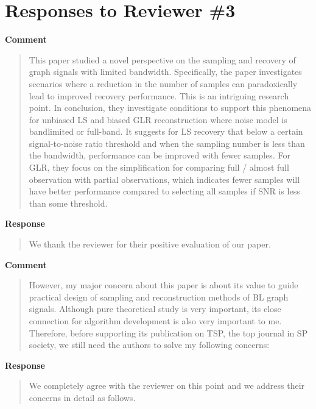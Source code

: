 \documentclass[11pt,onecolumn,journal]{IEEEtran}
\theoremstyle{definition}
\begin{document}
\newpage
\section*{Responses to Reviewer \#3}
\textbf{Comment}
\begin{quote}
    This paper studied a novel perspective on the sampling and recovery of graph signals with limited bandwidth. Specifically, the paper investigates scenarios where a reduction in the number of samples can paradoxically lead to improved recovery performance. This is an intriguing research point. In conclusion, they investigate conditions to support this phenomena for unbiased LS and biased GLR reconstruction where noise model is bandlimited or full-band.  It suggests for LS recovery that below a certain signal-to-noise ratio threshold and when the sampling number is less than the bandwidth, performance can be improved with fewer samples. For GLR, they focus on the simplification for comparing full / almost full observation with partial observations, which indicates fewer samples will have better performance compared to selecting all samples if SNR is less than some threshold.
\end{quote}

\textbf{Response}
\begin{quote}
We thank the reviewer for their positive evaluation of our paper.
\end{quote}

\textbf{Comment}
\begin{quote}
 However, my major concern about this paper is about its value to guide practical design of sampling and reconstruction methods of BL graph signals. Although pure theoretical study is very important, its close connection for algorithm development is also very important to me.  Therefore, before supporting its publication on TSP, the top journal in SP society, we still need the authors to solve my following concerns:
 \end{quote}
 
\textbf{Response}
\begin{quote}
We completely agree with the reviewer on this point and we address their concerns in detail as follows.
\end{quote}
 
\end{document}
